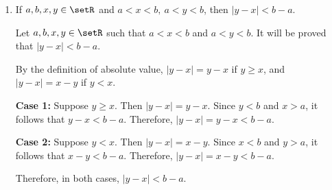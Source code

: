 \begin{enumerate}
\begin{enumerate}
\begin{subprove}
      \textbf{Case 1:} Suppose \(x-a \ge 0\).
      Then \(x-a < \varepsilon\), so \(x < a+\varepsilon\).
      Since \(x-a \ge 0\), it follows that \(x \ge a > a-\varepsilon\).
      Therefore, \(a-\varepsilon < x < a+\varepsilon\).
      
      \textbf{Case 2:} Suppose \(x-a < 0\).
      Then \(-(x-a) = a-x < \varepsilon\), so \(a-\varepsilon < x\).
      Since \(x-a < 0\), it follows that \(x < a < a+\varepsilon\).
      Therefore, \(a-\varepsilon < x < a+\varepsilon\).
      
      Therefore, in both cases, if \(|x-a| < \varepsilon\), then \(a-\varepsilon < x < a+\varepsilon\).
      
      (\(\Leftarrow\)) Suppose that \(a-\varepsilon < x < a+\varepsilon\) for the sake of direct proof.
      It follows that \(-\varepsilon < x-a < \varepsilon\).
      By the definition of absolute value, since \(-\varepsilon < x-a < \varepsilon\), it follows that \(|x-a| < \varepsilon\).
      
      Therefore, \(|x-a| < \varepsilon\) if and only if \(a-\varepsilon < x < a+\varepsilon\).
    \end{subprove}
    \item If \(a,b,x,y\in\setR\) and \(a<x<b,\ a<y<b\), then \(|y-x|<b-a\).
    \begin{subprove}
      Let \(a, b, x, y \in \setR\) such that \(a < x < b\) and \(a < y < b\).
      It will be proved that \(|y-x| < b-a\).
      
      By the definition of absolute value, \(|y-x| = y-x\) if \(y \ge x\), and \(|y-x| = x-y\) if \(y < x\).
      
      \textbf{Case 1:} Suppose \(y \ge x\).
      Then \(|y-x| = y-x\).
      Since \(y < b\) and \(x > a\), it follows that \(y-x < b-a\).
      Therefore, \(|y-x| = y-x < b-a\).
      
      \textbf{Case 2:} Suppose \(y < x\).
      Then \(|y-x| = x-y\).
      Since \(x < b\) and \(y > a\), it follows that \(x-y < b-a\).
      Therefore, \(|y-x| = x-y < b-a\).
      
      Therefore, in both cases, \(|y-x| < b-a\).
    \end{subprove}
  \end{enumerate}





\end{enumerate}
